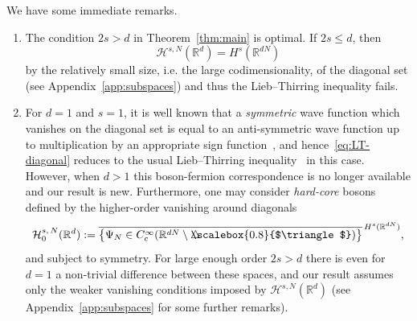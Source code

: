 \documentclass[AHL, Unicode, longabstracts, published]{cedram}
\newcommand*\R {\mathbb{R}}
\newcommand\1{{\ensuremath {\mathds 1} }}
\newcommand{\cH}{\mathcal{H}}
\newcommand{\bDelta}{{\mbox{$\triangle$}\hspace{-8.6pt}\scalebox{0.8}{$\triangle$}}}
\begin{document}
We have some immediate remarks.
\begin{enumerate}
\item The condition $2s>d$ in Theorem~\ref{thm:main} is optimal. If $2s\le d$, then
\[
\cH^{s,N}(\R^d)=H^s(\R^{dN})
\]
by the relatively small size, i.e. the large codimensionality, of the diagonal set (see Appendix~\ref{app:subspaces}) and thus the Lieb--Thirring inequality fails.

\item For $d=1$ and $s=1$, it is well known that a \emph{symmetric} wave function which vanishes on the diagonal set is equal to an anti-symmetric wave function up to multiplication by an appropriate sign function~\cite{Girardeau-60}, and hence~\eqref{eq:LT-diagonal} reduces to the usual Lieb--Thirring inequality~\cite{LieThi-76} in this case. However, when $d>1$ this boson-fermion correspondence is no longer available and our result is new. Furthermore, one may consider \emph{hard-core} bosons defined by the higher-order vanishing around diagonals
\begin{equation}\label{eq:cH0}
\cH_0^{s,\,N}(\R^d):= \overline{\bigl\{ \Psi_N \in C_c^\infty(\R^{dN} \setminus \bDelta) \bigr\} }^{\, H^s(\R^{dN})},
\end{equation}
and subject to symmetry. For large enough order $2s>d$ there is even for\linebreak$d=1$ a non-trivial difference between these spaces, and our result assumes only the weaker vanishing conditions imposed by $\cH^{s,N}(\R^d)$ (see Appendix~\ref{app:subspaces} for some further remarks).


\end{enumerate}
\end{document}
